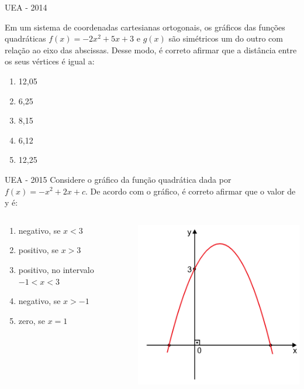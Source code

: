 \documentclass[11pt]{beamer}
\newif\ifgab
\newcommand{\gab}[1]{%
  \ifgab
    \textcolor{red!80!black}{\textbf{#1}}%
  \else
    #1%
  \fi
}
\begin{document}
\begin{frame}{UEA - 2014}

    Em um sistema de coordenadas cartesianas ortogonais, os gráficos das funções quadráticas $f(x) = -2x^{2} + 5x + 3$ e $g(x)$ são simétricos um do outro com relação ao eixo das abscissas. Desse modo, é correto afirmar que a distância entre os seus vértices é igual a:

    \begin{enumerate}[a]
        \item 12,05
        \item 6,25
        \item 8,15
        \item 6,12
        \item \gab{12,25} %
    \end{enumerate}
    
\end{frame}

\begin{frame}{UEA - 2015}
    Considere o gráfico da função quadrática dada por $f(x) = -x^{2} + 2x + c$. De acordo com o gráfico, é correto afirmar que o valor de y é:
    \begin{columns}
        \begin{column}{0.4\textwidth}
            \begin{enumerate}[a]
                \item negativo, se $x < 3$
                \item positivo, se $x > 3$
                \item \gab{positivo, no intervalo $ -1 < x < 3$} %
                \item negativo, se $x > -1$
                \item zero, se $x = 1$
            \end{enumerate}
        \end{column}

        \begin{column}{0.6\textwidth}
            \centering
            \includegraphics[width=0.7\linewidth]{imagens/uea-2015.png}
        \end{column}
    \end{columns}
    
\end{frame}
\end{document}
